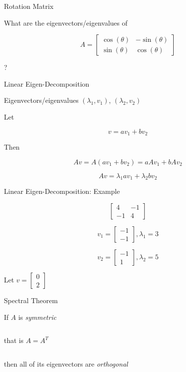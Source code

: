 \documentclass{beamer}
\begin{document}
\begin{frame}{Rotation Matrix}

What are the eigenvectors/eigenvalues of 

\[ A = \left[ \begin{array}{cc} \cos(\theta) & -\sin(\theta) \\ \sin(\theta) & \cos(\theta) \end{array} \right] \]

?


\end{frame}


\begin{frame}{Linear Eigen-Decomposition}

Eigenvectors/eigenvalues $(\lambda_1, v_1)$, $(\lambda_2, v_2)$

Let 

\[ v = av_1 + bv_2 \]

Then 

\[ Av = A(av_1 + bv_2) = aAv_1 + bAv_2 \]

\[ Av = \lambda_1 a v_1 + \lambda_2 b v_2 \]

\end{frame}


\begin{frame}{Linear Eigen-Decomposition: Example}

\[ \left[ \begin{array}{cc} 4 & -1\\ -1 & 4 \end{array} \right]  \]

\[ v_1 = \left[ \begin{array}{c} -1 \\ -1 \end{array} \right], \lambda_1 = 3\]

\[ v_2 = \left[ \begin{array}{c} -1 \\ 1 \end{array} \right], \lambda_2 = 5 \]

Let $v = \left[ \begin{array}{c}  0 \\ 2 \end{array} \right] $

\end{frame}


\begin{frame}{Spectral Theorem}

If $A$ is {\em symmetric}

\[ \]
 
that is $A = A^T$

\[ \]

then all of its eigenvectors are {\em orthogonal}

\end{frame}
\end{document}
